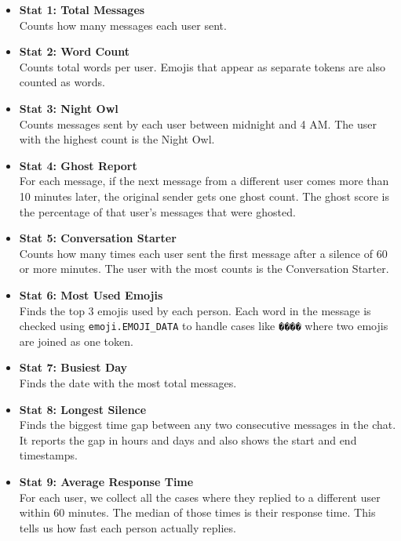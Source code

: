\documentclass{article}
\begin{document}
\begin{itemize}

\item \textbf{Stat 1: Total Messages} \\
Counts how many messages each user sent.

\item \textbf{Stat 2: Word Count} \\
Counts total words per user. Emojis that appear as separate tokens are also counted as words.

\item \textbf{Stat 3: Night Owl} \\
Counts messages sent by each user between midnight and 4 AM. The user with the highest count is the Night Owl.

\item \textbf{Stat 4: Ghost Report} \\
For each message, if the next message from a different user comes more than 10 minutes later, the original sender gets one ghost count. The ghost score is the percentage of that user's messages that were ghosted.

\item \textbf{Stat 5: Conversation Starter} \\
Counts how many times each user sent the first message after a silence of 60 or more minutes. The user with the most counts is the Conversation Starter.

\item \textbf{Stat 6: Most Used Emojis} \\
Finds the top 3 emojis used by each person. Each word in the message is checked using \texttt{emoji.EMOJI\_DATA} to handle cases like \texttt{����} where two emojis are joined as one token.

\item \textbf{Stat 7: Busiest Day} \\
Finds the date with the most total messages.

\item \textbf{Stat 8: Longest Silence} \\
Finds the biggest time gap between any two consecutive messages in the chat. It reports the gap in hours and days and also shows the start and end timestamps.

\item \textbf{Stat 9: Average Response Time} \\
For each user, we collect all the cases where they replied to a different user within 60 minutes. The median of those times is their response time. This tells us how fast each person actually replies.


\end{itemize}
\end{document}
